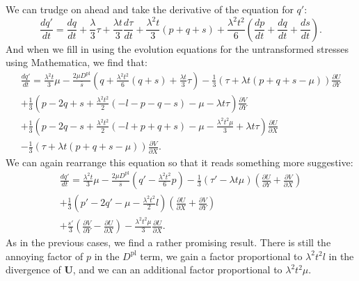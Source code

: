 \documentclass[11pt]{article}
\newcommand{\p}{\partial}
\newcommand{\bU}{\mathbf{U}}
\newcommand{\Dpl}{D^\text{pl}}
\begin{document}
We can trudge on ahead and take the derivative of the equation for $q'$:
\begin{equation*}
    \frac{dq'}{dt} = \frac{dq}{dt} + \frac{\lambda}{3}\tau + \frac{\lambda t}{3}\frac{d\tau}{dt} + \frac{\lambda^2t}{3}(p + q + s) + \frac{\lambda^2t^2}{6}\left(\frac{dp}{dt} + \frac{dq}{dt} + \frac{ds}{dt}\right).
\end{equation*}
And when we fill in using the evolution equations for the untransformed stresses using Mathematica, we find that:
\begin{multline*}
    \frac{dq'}{dt} = \frac{\lambda^2t}{3}\mu - \frac{2\mu\Dpl}{\bar{s}}\left(q + \frac{\lambda^2t^2}{6}(q+s) + \frac{\lambda t}{3}\tau\right) - \frac{1}{3}\left(\tau + \lambda t (p + q + s - \mu)\right)\frac{\p U}{\p Y}\\
    + \frac{1}{3}\left(p - 2q + s + \frac{\lambda^2t^2}{2}(-l - p - q - s) - \mu -\lambda t\tau\right)\frac{\p V}{\p Y}\\
    + \frac{1}{3}\left(p - 2q - s + \frac{\lambda^2t^2}{2}(-l + p + q + s) - \mu - \frac{ \lambda^2t^2\mu }{3} + \lambda t\tau\right)\frac{\p U}{\p X}\\
    - \frac{1}{3}(\tau + \lambda t (p + q + s - \mu))\frac{\p V}{\p X}.
\end{multline*}
We can again rearrange this equation so that it reads something more suggestive:
\begin{multline}
    \frac{dq'}{dt} = \frac{\lambda^2t}{3}\mu - \frac{2\mu\Dpl}{\bar{s}}\left(q' - \frac{\lambda^2t^2}{6}p\right) - \frac{1}{3}(\tau' - \lambda t\mu)\left(\frac{\p U}{\p Y} + \frac{\p V}{\p X}\right)\\
    + \frac{1}{3}\left(p' - 2q' - \mu - \frac{\lambda^2t^2}{2}l\right)\left(\frac{\p U}{\p X} + \frac{\p V}{\p Y}\right)\\
    + \frac{s'}{3}\left(\frac{\p V}{\p Y} - \frac{\p U}{\p X}\right) - \frac{\lambda^2t^2\mu}{3}\frac{\p U}{\p X}.
    \label{eqn:dqpdt}
\end{multline}
As in the previous cases, we find a rather promising result. There is still the annoying factor of $p$ in the $\Dpl$ term, we gain a factor proportional to $\lambda^2t^2l$ in the divergence of $\bU$, and we can an additional factor proportional to $\lambda^2t^2\mu$.
\end{document}
